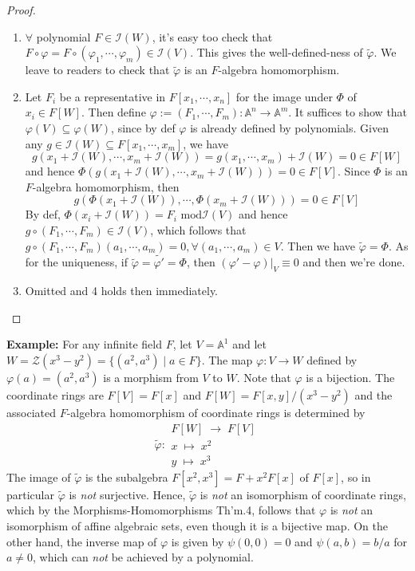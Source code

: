 \begin{proof}
    \begin{enumerate}
        \item $\forall$ polynomial $F\in \mathcal{I}(W)$, it's easy too check that $F \circ \varphi = F \circ (\varphi_1 ,\cdots, \varphi_m) \in \mathcal{I}(V)$. This gives the well-defined-ness of $\widetilde{\varphi}$. We leave to readers to check that $\widetilde{\varphi}$ is an $F$-algebra homomorphism.

        \item Let $F_i$ be a representative in $F[x_1 ,\cdots, x_n]$ for the image under $\Phi$ of $x_i \in F[W]$. Then define $\varphi:= (F_1 ,\cdots, F_m): \mathbb{A}^n \to \mathbb{A}^m$. It suffices to show that $\varphi(V) \subseteq \varphi(W)$, since by def $\varphi$ is already defined by polynomials. Given any $g \in \mathcal{I} (W) \subseteq F[x_1 ,\cdots, x_m]$, we have
        $$g(x_1 +\mathcal{I}(W) ,\cdots, x_m +\mathcal{I}(W)) = g(x_1 ,\cdots, x_m) +\mathcal{I} (W)=0 \in F[W]$$
        and hence $\Phi (g(x_1 +\mathcal{I}(W), \cdots, x_m+ \mathcal{I}(W)))=0 \in F[V]$. Since $\Phi$ is an $F$-algebra homomorphism, then
        $$g(\Phi( x_1+\mathcal{I}(W)) ,\cdots, \Phi(x_m+ \mathcal{I}(W))) =0\in F[V]$$
        By def, $\Phi(x_i+ \mathcal{I}(W)) =F_i \text{ mod}\mathcal{I}(V)$ and hence $g \circ (F_1 ,\cdots, F_m) \in \mathcal{I}(V)$, which follows that $g\circ (F_1 ,\cdots, F_m) (a_1 ,\cdots, a_m)=0 , \forall (a_1 ,\cdots, a_m) \in V$. Then we have $\widetilde{\varphi}= \Phi$. As for the uniqueness, if $\widetilde\varphi = \widetilde{\varphi'} =\Phi$, then $(\varphi'- \varphi)|_V \equiv 0$ and then we're done.

        \item Omitted and 4 holds then immediately.
    \end{enumerate}
\end{proof}

\noindent\textbf{Example:} For any infinite field $F$, let $V= \mathbb{A}^1$ and let $W = \mathcal{Z} (x^3-y^2) =\{ (a^2,a^3) \mid a\in F\}$. The map $\varphi: V\to W$ defined by $\varphi(a) =(a^2,a^3)$ is a morphism from $V$ to $W$. Note that $\varphi$ is a bijection. The coordinate rings are $F[V] =F[x]$ and $F[W]= F[x,y] /(x^3-y^2)$ and the associated $F$-algebra homomorphism of coordinate rings is determined by
$$\widetilde{\varphi}: \substack{F[W] \;\to\; F[V]\\
x \;\mapsto\; x^2\\
y\;\mapsto \;x^3}$$
The image of $\widetilde{\varphi}$ is the subalgebra $F[x^2,x^3]= F +x^2F[x]$ of $F[x]$, so in particular $\widetilde{\varphi}$ is \textit{not} surjective. Hence, $\widetilde{\varphi}$ is \textit{not} an isomorphism of coordinate rings, which by the Morphisms-Homomorphisms Th'm.4, follows that $\varphi$ is \textit{not} an isomorphism of affine algebraic sets, even though it is a bijective map. On the other hand, the inverse map of $\varphi$ is given by $\psi(0,0)=0$ and $\psi(a,b)= b/a$ for $a\neq 0$, which can \textit{not} be achieved by a polynomial.


